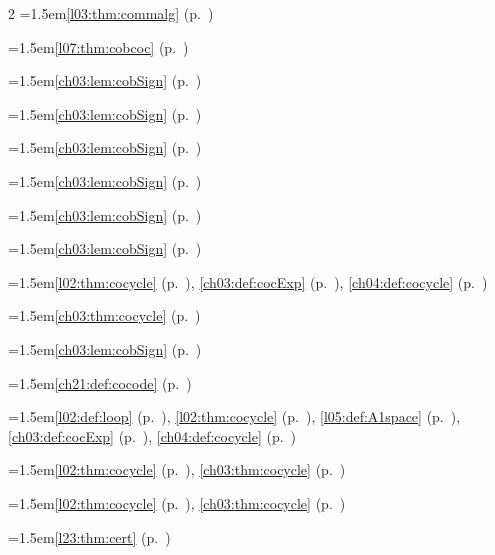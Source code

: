 \begin{multicols}{2}
\hangindent=1.5em\quad \ref{l03:thm:commalg} (p.~\pageref{l03:thm:commalg})\par
\hangindent=1.5em\quad \ref{l07:thm:cobcoc} (p.~\pageref{l07:thm:cobcoc})\par
\hangindent=1.5em\quad \ref{ch03:lem:cobSign} (p.~\pageref{ch03:lem:cobSign})\par
\hangindent=1.5em\quad \ref{ch03:lem:cobSign} (p.~\pageref{ch03:lem:cobSign})\par
\hangindent=1.5em\quad \ref{ch03:lem:cobSign} (p.~\pageref{ch03:lem:cobSign})\par
\hangindent=1.5em\quad \ref{ch03:lem:cobSign} (p.~\pageref{ch03:lem:cobSign})\par
\hangindent=1.5em\quad \ref{ch03:lem:cobSign} (p.~\pageref{ch03:lem:cobSign})\par
\hangindent=1.5em\quad \ref{ch03:lem:cobSign} (p.~\pageref{ch03:lem:cobSign})\par
\hangindent=1.5em\quad \ref{l02:thm:cocycle} (p.~\pageref{l02:thm:cocycle}), \ref{ch03:def:cocExp} (p.~\pageref{ch03:def:cocExp}), \ref{ch04:def:cocycle} (p.~\pageref{ch04:def:cocycle})\par
\hangindent=1.5em\quad \ref{ch03:thm:cocycle} (p.~\pageref{ch03:thm:cocycle})\par
\hangindent=1.5em\quad \ref{ch03:lem:cobSign} (p.~\pageref{ch03:lem:cobSign})\par
\hangindent=1.5em\quad \ref{ch21:def:cocode} (p.~\pageref{ch21:def:cocode})\par
\hangindent=1.5em\quad \ref{l02:def:loop} (p.~\pageref{l02:def:loop}), \ref{l02:thm:cocycle} (p.~\pageref{l02:thm:cocycle}), \ref{l05:def:A1space} (p.~\pageref{l05:def:A1space}), \ref{ch03:def:cocExp} (p.~\pageref{ch03:def:cocExp}), \ref{ch04:def:cocycle} (p.~\pageref{ch04:def:cocycle})\par
\hangindent=1.5em\quad \ref{l02:thm:cocycle} (p.~\pageref{l02:thm:cocycle}), \ref{ch03:thm:cocycle} (p.~\pageref{ch03:thm:cocycle})\par
\hangindent=1.5em\quad \ref{l02:thm:cocycle} (p.~\pageref{l02:thm:cocycle}), \ref{ch03:thm:cocycle} (p.~\pageref{ch03:thm:cocycle})\par
\hangindent=1.5em\quad \ref{l23:thm:cert} (p.~\pageref{l23:thm:cert})\par

\end{multicols}
